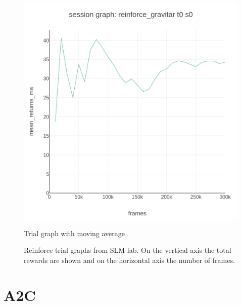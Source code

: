 \documentclass[12pt,a4paper]{report}
\begin{document}
\begin{itemize}
\begin{figure}[ht!]
\begin{minipage}[c]{0.5\linewidth}
			\includegraphics[height=0.3\textheight, width=0.9\linewidth]{reinforce_gravitar_t0_s0_session_graph_eval_mean_returns_ma_vs_frames.png}
			\caption{Trial graph with moving average}
		\end{minipage}
		\caption{Reinforce trial graphs from SLM lab. On the vertical axis the total rewards are shown and on the horizontal axis the number of frames.}
	\end{figure}
	
\end{itemize}
	
	\section{A2C}
	
\end{document}

